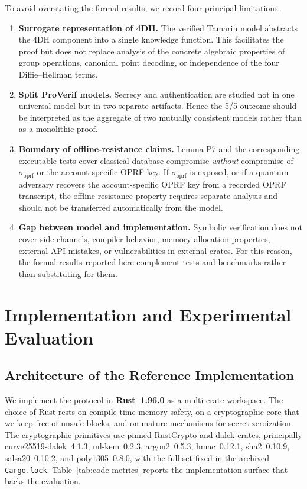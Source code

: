 \documentclass{ieeeijc}
\newcommand{\sigoprf}{\sigma_{\mathrm{oprf}}}
\newcommand{\codeid}[1]{\textsf{#1}}
\theoremstyle{remark}
\begin{document}
To avoid overstating the formal results, we record four principal limitations.
\begin{enumerate}
  \item \textbf{Surrogate representation of 4DH.} The verified Tamarin
        model abstracts the 4DH component into a single knowledge
        function. This facilitates the proof but does not replace
        analysis of the concrete algebraic properties of group
        operations, canonical point decoding, or independence of the
        four Diffie--Hellman terms.
  \item \textbf{Split ProVerif models.} Secrecy and authentication are
        studied not in one universal model but in two separate
        artifacts. Hence the 5/5 outcome should be interpreted as the
        aggregate of two mutually consistent models rather than as a
        monolithic proof.
  \item \textbf{Boundary of offline-resistance claims.} Lemma P7 and the
        corresponding executable tests cover classical database compromise
        \emph{without} compromise of $\sigoprf$ or the account-specific OPRF
        key. If $\sigoprf$ is exposed, or if a quantum adversary recovers the
        account-specific OPRF key from a recorded OPRF transcript, the
        offline-resistance property requires separate analysis and
        should not be transferred automatically from the model.
  \item \textbf{Gap between model and implementation.} Symbolic
        verification does not cover side channels, compiler behavior,
        memory-allocation properties, external-API mistakes, or
        vulnerabilities in external crates. For this reason, the formal
        results reported here complement tests and benchmarks rather than
        substituting for them.
\end{enumerate}

\section{Implementation and Experimental Evaluation}

\subsection{Architecture of the Reference Implementation}

We implement the protocol in \textbf{Rust~1.96.0} as a multi-crate
workspace. The choice of Rust rests on compile-time memory safety, on a
cryptographic core that we keep free of \codeid{unsafe} blocks, and on
mature mechanisms for secret zeroization. The cryptographic primitives use
pinned RustCrypto and dalek crates, principally \codeid{curve25519-dalek}~4.1.3,
\codeid{ml-kem}~0.2.3, \codeid{argon2}~0.5.3, \codeid{hmac}~0.12.1,
\codeid{sha2}~0.10.9, \codeid{salsa20}~0.10.2, and \codeid{poly1305}~0.8.0, with
the full set fixed in the archived \texttt{Cargo.lock}.
Table~\ref{tab:code-metrics} reports the implementation surface that
backs the evaluation.
\end{document}
